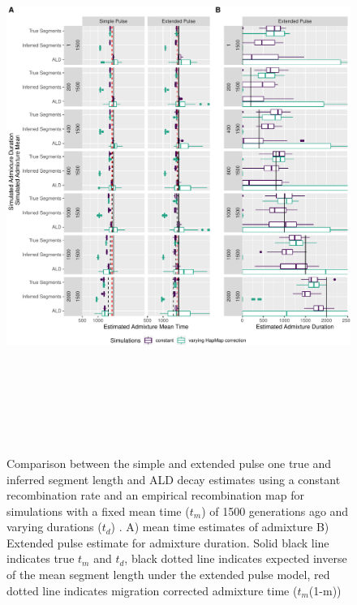 \documentclass[11pt]{article}
\begin{document}
\begin{figure}
\centering
\includegraphics[width=16cm,height=18cm,keepaspectratio]{ATE_Revisions_files/figure-latex/figResult2_1-1.pdf}
\caption{\label{fig:fig3} Comparison between the simple and extended pulse one true and inferred segment length and ALD decay estimates using a constant recombination rate and an empirical recombination map for simulations with a fixed mean time ($t_m$) of 1500 generations ago and varying durations ($t_d$) . A) mean time estimates of admixture B) Extended pulse estimate for admixture duration. Solid black line indicates true $t_m$ and $t_d$, black dotted line indicates expected inverse of the mean segment length under the extended pulse model, red dotted line indicates migration corrected admixture time ($t_m$(1-m)) }
\end{figure}
\end{document}
